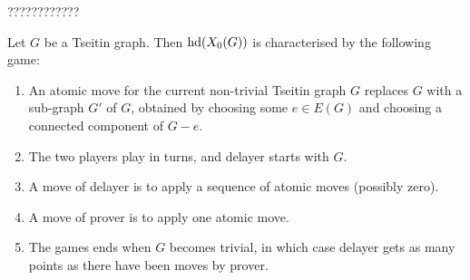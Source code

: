 \documentclass[12pt]{book}
\begin{document}
????????????
\begin{lem}\label{lem:game1}
      Let $G$ be a Tseitin graph. Then $\operatorname{hd}(X_0(G))$ is characterised by the following game:
	  \begin{enumerate}
	  \item An atomic move for the current non-trivial Tseitin graph $G$ replaces $G$ with a sub-graph $G'$ of $G$, obtained by choosing 
	  some $e \in E(G)$ and choosing a connected component of $G - e$.
	  \item The two players play in turns, and delayer starts with $G$.
	  \item A move of delayer is to apply a sequence of atomic moves (possibly zero).
	  \item A move of prover is to apply one atomic move.
	  \item The games ends when $G$ becomes trivial, in which case delayer gets as many points as there have been moves by prover.
	  \end{enumerate}
\end{lem}
\end{document}
